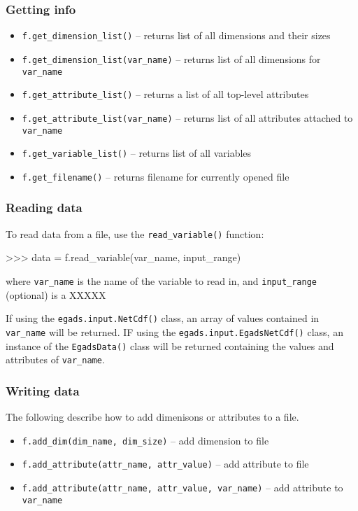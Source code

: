 \documentclass[a4paper,11pt]{report}
\begin{document}
\subsubsection{Getting info}

\begin{itemize}
\item \verb|f.get_dimension_list()| -- returns list of all dimensions and their sizes
\item \verb|f.get_dimension_list(var_name)| -- returns list of all dimensions for \verb|var_name|
\item \verb|f.get_attribute_list()| -- returns a list of all top-level attributes
\item \verb|f.get_attribute_list(var_name)| -- returns list of all attributes attached to \verb|var_name|
\item \verb|f.get_variable_list()| -- returns list of all variables
\item \verb|f.get_filename()| -- returns filename for currently opened file
\end{itemize}

\subsubsection{Reading data}

To read data from a file, use the \verb|read_variable()| function:

\begin{command}
    >>> data = f.read_variable(var_name, input_range)
\end{command}
where \verb|var_name| is the name of the variable to read in, and \verb|input_range| (optional) is a XXXXX

If using the \verb|egads.input.NetCdf()| class, an array of values contained in \verb|var_name| 
will be returned. IF using the \verb|egads.input.EgadsNetCdf()| class, an instance of the 
\verb|EgadsData()| class will be returned containing the values and attributes of \verb|var_name|.

\subsubsection{Writing data}

The following describe how to add dimenisons or attributes to a file.
\begin{itemize}
\item \verb|f.add_dim(dim_name, dim_size)| -- add dimension to file
\item \verb|f.add_attribute(attr_name, attr_value)| -- add attribute to file
\item \verb|f.add_attribute(attr_name, attr_value, var_name)| -- add attribute to \verb|var_name|
\end{itemize}
\end{document}
